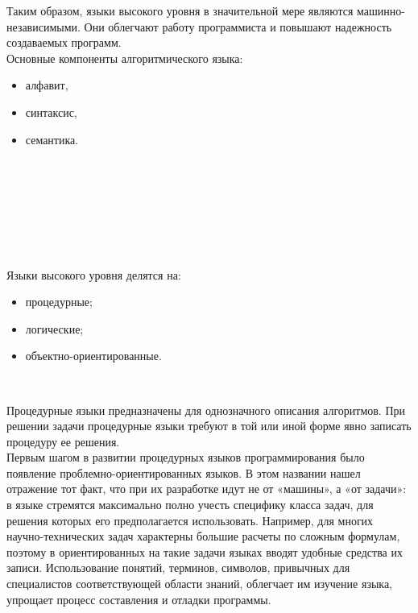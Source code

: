 Таким образом, языки высокого уровня в значительной мере являются машинно-независимыми. Они облегчают работу программиста и повышают надежность создаваемых программ. \\

Основные компоненты алгоритмического языка: \\

\begin{itemize}
  \item алфавит,
  \item синтаксис,
  \item семантика.
\end{itemize}
\

\

\

\

Языки высокого уровня делятся на: \\

\begin{itemize}
  \item процедурные;
  \item логические;
  \item объектно-ориентированные.
\end{itemize}
\

Процедурные языки предназначены для однозначного описания алгоритмов. При решении задачи процедурные языки требуют в той или иной форме явно записать процедуру ее решения. \\

Первым шагом в развитии процедурных языков программирования было появление проблемно-ориентированных языков. В этом названии нашел отражение тот факт, что при их разработке идут не от «машины», а «от задачи»: в языке стремятся максимально полно учесть специфику класса задач, для решения которых его предполагается использовать. Например, для многих научно-технических задач характерны большие расчеты по сложным формулам, поэтому в ориентированных на такие задачи языках вводят удобные средства их записи. Использование понятий, терминов, символов, привычных для специалистов соответствующей области знаний, облегчает им изучение языка, упрощает процесс составления и отладки программы. \\

